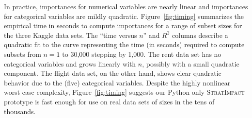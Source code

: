\documentclass[11pt]{article}
\newcommand{\figref}[1]{Figure~\ref{#1}}
\newcommand{\simp}{\fontfamily{cmr}\textsc{\small StratImpact}}
\begin{document}
In practice, importances for numerical variables are nearly linear and importances for categorical variables are mildly quadratic. \figref{fig:timing} summarizes the empirical time in seconds to compute importances for a range of subset sizes for the three Kaggle data sets. The ``time versus $n$'' and $R^2$ columns describe a quadratic fit to the curve representing the time (in seconds) required to compute subsets from $n=1$ to 30,000 stepping by 1,000. The rent data set has no categorical variables and grows linearly with $n$, possibly with a small quadratic component. The flight data set, on the other hand, shows clear quadratic behavior due to the (five) categorical variables. Despite the highly nonlinear worst-case complexity, \figref{fig:timing} suggests our Python-only \simp{} prototype is fast enough for use on real data sets of sizes in the tens of thousands. 
\end{document}
